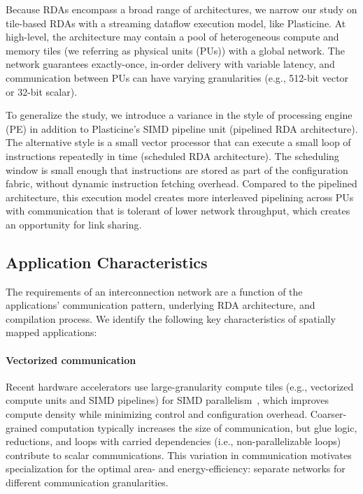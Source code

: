 Because RDAs encompass a broad range of architectures, we narrow our study on tile-based RDAs with
a streaming dataflow execution model, like Plasticine.
At high-level, the architecture may contain a pool of heterogeneous compute and memory tiles (we referring as 
physical units (PUs)) with a global network.
The network guarantees exactly-once, in-order delivery with variable latency, and communication 
between PUs can have varying granularities (e.g., 512-bit vector or 32-bit scalar).

To generalize the study, we introduce a variance in the style of processing engine (PE) in addition
to Plasticine's SIMD pipeline unit (pipelined RDA architecture).
The alternative style is a small vector processor that can execute a small loop of instructions repeatedly in
time (scheduled RDA architecture).
The scheduling window is small enough that instructions are stored as part of the configuration fabric, 
without dynamic instruction fetching overhead. 
Compared to the pipelined architecture, 
this execution model creates more interleaved pipelining across PUs with communication that is
tolerant of lower network throughput, which creates an opportunity for link sharing.

\subsection{Application Characteristics} \label{sec:appchar}
The requirements of an interconnection network are a function of the applications' communication
pattern, underlying RDA architecture, and compilation process.
We identify the following key characteristics of spatially mapped applications:

\paragraph{Vectorized communication}
Recent hardware accelerators use large-granularity compute tiles (e.g., vectorized compute units and SIMD pipelines) for
SIMD parallelism~\cite{plasticine, xilinx-acap}, which improves compute density while minimizing control and configuration overhead. 
Coarser-grained computation typically increases the size of communication, but glue logic, reductions, and loops with carried dependencies (i.e., non-parallelizable loops) contribute to scalar communications. 
This variation in communication motivates specialization for the optimal area- and energy-efficiency: separate networks for different communication granularities.

